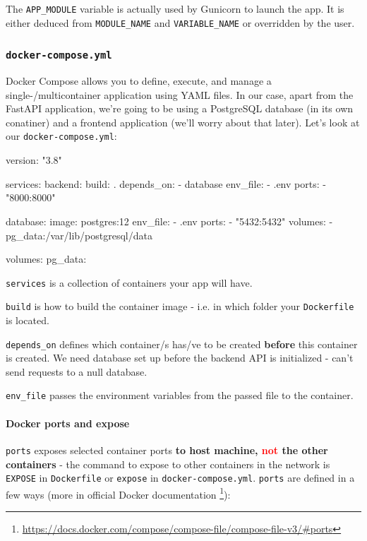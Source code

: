 \documentclass{article}
\newcommand{\flink}[1]{\footnote{\href{#1}{#1}}}
\newcommand{\dockerinline}[1]{\lstinline[language=docker, style=cstyle, basicstyle=\ttfamily\normalsize]{#1}}
\begin{document}
The \texttt{APP\_MODULE} variable is actually used by Gunicorn to launch the app. It is either deduced from \texttt{MODULE\_NAME} and \texttt{VARIABLE\_NAME} or overridden by the user.

\subsubsection{\texttt{docker-compose.yml}\label{preparations:dockercompose}}

Docker Compose allows you to define, execute, and manage a single-/multicontainer application using YAML files. In our case, apart from the FastAPI application, we're going to be using a PostgreSQL database (in its own conatiner) and a frontend application (we'll worry about that later). Let's look at our \texttt{docker-compose.yml}:

\begin{dockercode}
version: "3.8"

services:
    backend:
        build: .
        depends_on:
            - database
        env_file:
            - .env
        ports:
            - "8000:8000"

    database:
        image: postgres:12
        env_file:
            - .env
        ports:
            - "5432:5432"
        volumes:
            - pg_data:/var/lib/postgresql/data

volumes:
    pg_data:
\end{dockercode}

\dockerinline{services} is a collection of containers your app will have.

\dockerinline{build} is how to build the container image - i.e. in which folder your \texttt{Dockerfile} is located.

\dockerinline{depends_on} defines which container/s has/ve to be created \textbf{before} this container is created. We need database set up before the backend API is initialized - can't send requests to a null database.

\dockerinline{env_file} passes the environment variables from the passed file to the container.

\paragraph{Docker ports and expose}

\dockerinline{ports} exposes selected container ports \textbf{to host machine, \textcolor{red}{not} the other containers} - the command to expose to other containers in the network is \dockerinline{EXPOSE} in \texttt{Dockerfile} or \dockerinline{expose} in \texttt{docker-compose.yml}. \dockerinline{ports} are defined in a few ways (more in official Docker documentation \flink{https://docs.docker.com/compose/compose-file/compose-file-v3/\#ports}):
\end{document}
